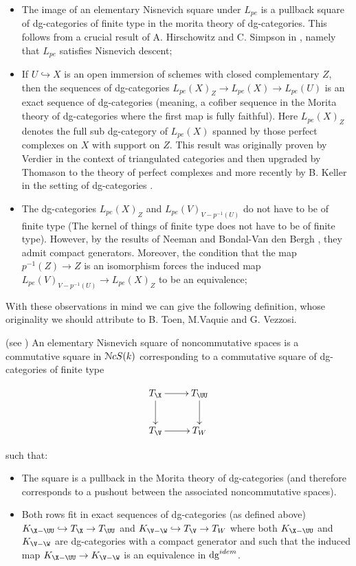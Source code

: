 \begin{refsection}
\begin{itemize}
\item The image of an elementary Nisnevich square under $L_{pe}$ is a pullback square of dg-categories of finite type in the morita theory of dg-categories. This follows from a crucial result of A. Hirschowitz  and C. Simpson in \cite{simpson-descente}, namely that $L_{pe}$ satisfies Nisnevich descent;
\item If $U\hookrightarrow X$ is an open immersion of schemes with closed complementary $Z$, then the sequences of dg-categories $L_{pe}(X)_{Z}\to L_{pe}(X)\to L_{pe}(U)$ is an exact sequence of dg-categories (meaning, a cofiber sequence in the Morita theory of dg-categories where the first map is fully faithful). Here $L_{pe}(X)_{Z}$ denotes the full sub dg-category of $L_{pe}(X)$ spanned by those perfect complexes on $X$ with support on $Z$. This result was originally proven by Verdier \cite{Verdier} in the context of triangulated categories and then upgraded by Thomason \cite{thomasonalgebraic} to the theory of perfect complexes and more recently by B. Keller in the setting of dg-categories \cite{keller-exact}.
\item The dg-categories $L_{pe}(X)_{Z}$ and $L_{pe}(V)_{V-p^{-1}(U)}$ do not have to be of finite type (The kernel of things of finite type does not have to be of finite type). However, by the results of Neeman \cite{neeman} and Bondal-Van den Bergh \cite{bondal-vandenbergh}, they admit compact generators. Moreover, the condition that the map $p^{-1}(Z)\to Z$ is an isomorphism forces the induced map $L_{pe}(V)_{V-p^{-1}(U)}\to  L_{pe}(X)_{Z}$ to be an equivalence;
\end{itemize}

With these observations in mind we can give the following definition, whose originality we should attribute to B. Toen, M.Vaquie and G. Vezzosi.

\begin{defn}(see \cite[6.44]{nc1})
An elementary Nisnevich square of noncommutative spaces is a commutative square in $\mathcal{N}cS(k)$ corresponding to a commutative square of dg-categories of finite type

$$
\xymatrix{
T_{\X}\ar[r] \ar[d] & T_{\UU}\ar[d]\\
T_{\V}\ar[r]& T_{W}
}
$$

\noindent such that:
\begin{itemize}
\item The square is a pullback in the Morita theory of dg-categories (and therefore corresponds to a pushout between the associated noncommutative spaces).
\item Both rows fit in exact sequences of dg-categories (as defined above) $K_{\X-\UU}\hookrightarrow T_{\X}\to T_{\UU}$ and  $K_{\V-\W}\hookrightarrow T_{\V}\to T_{W}$ where both $K_{\X-\UU}$ and $K_{\V-\W}$ are dg-categories with a compact generator and such that the induced map $K_{\X-\UU}\to K_{\V-\W}$ is an equivalence in $\mathrm{dg}^{idem}$.
\end{itemize}
\end{defn}


\end{refsection}
